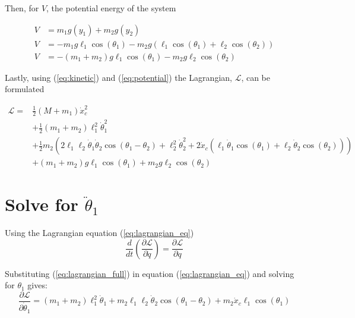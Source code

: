 \documentclass[10pt]{article}
\begin{document}
    Then, for $V$, the potential energy of the system

    \begin{equation} \label{eq:potential}
        \begin{aligned}
        V &= m_1g(y_1) + m_2g(y_2)     \\
        V &= -m_1g\ell_1\cos(\theta_1) - m_2g(\ell_1\cos(\theta_1) +\ell_2\cos(\theta_2))\\
        V &= -(m_1+m_2)g\ell_1\cos(\theta_1) - m_2g\ell_2\cos(\theta_2)
        \end{aligned}
    \end{equation}
    
    Lastly, using (\ref{eq:kinetic}) and (\ref{eq:potential}) the 
    Lagrangian, $\mathcal{L}$, can be formulated
    
    \begin{equation} \label{eq:lagrangian_full}
        \begin{aligned}
            \mathcal{L} = & \frac{1}{2}(M + m_1) \dot x_c^2 \\
            & + \frac{1}{2}(m_1 + m_2)\ell_1^2\dot\theta_1^2 \\
            & + \frac{1}{2} m_2 \left(2\ell_1\ell_2 \dot\theta_1 \dot\theta_2 \cos(\theta_1 - \theta_2) + \ell_2^2\dot\theta_2^2 + 2\dot x_c(\ell_1 \dot \theta_1 \cos(\theta_1) + \ell_2 \dot \theta_2 \cos(\theta_2))\right) \\
            & + (m_1 + m_2)g\ell_1\cos(\theta_1) + m_2g\ell_2\cos(\theta_2)
        \end{aligned}
    \end{equation}
    

    \pagebreak
    \section{Solve for $\ddot \theta_1$}

    Using the Lagrangian equation (\ref{eq:lagrangian_eq})
    \begin{equation} \label{eq:lagrangian_eq}
        \frac{d}{dt} \left(\frac{\partial \mathcal{L}}{\partial \dot q} \right) = 
        \frac{\partial \mathcal{L}}{\partial q}
    \end{equation}

    Substituting (\ref{eq:lagrangian_full}) in equation (\ref{eq:lagrangian_eq}) and solving for $\theta_1$ gives:
    \begin{equation} \label{eq: lagrange Step1}
        \frac{\partial \mathcal{L}}{\partial \dot\theta_1} = 
         (m_1 + m_2)\ell_1^2\dot\theta_1 + m_2\ell_1\ell_2\dot\theta_2\cos(\theta_1 - \theta_2) + m_2\dot x_c\ell_1\cos(\theta_1)
    \end{equation}
\end{document}
